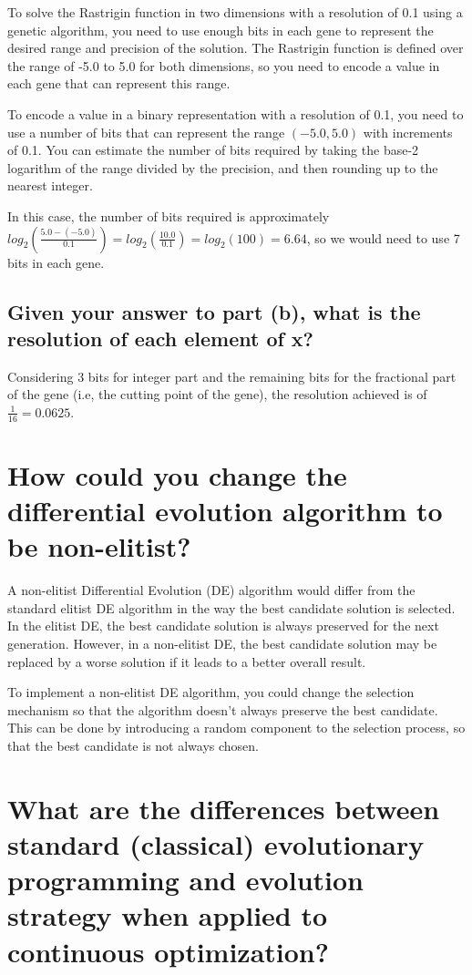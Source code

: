 \documentclass[conference]{IEEEtran}
\begin{document}
To solve the Rastrigin function in two dimensions with a resolution of 0.1 using a genetic algorithm, you need to use enough bits in each gene to represent the desired range and precision of the solution. The Rastrigin function is defined over the range of -5.0 to 5.0 for both dimensions, so you need to encode a value in each gene that can represent this range.

To encode a value in a binary representation with a resolution of 0.1, you need to use a number of bits that can represent the range $(-5.0, 5.0)$ with increments of 0.1. You can estimate the number of bits required by taking the base-2 logarithm of the range divided by the precision, and then rounding up to the nearest integer.

In this case, the number of bits required is approximately $log_2\left(\frac{5.0-(-5.0)}{0.1}\right) = log_2\left(\frac{10.0}{0.1}\right) = log_2(100) = 6.64$, so we would need to use 7 bits in each gene.

\subsection{Given your answer to part (b), what is the resolution of each element of x?}

Considering 3 bits for integer part and the remaining bits for the fractional part of the gene (i.e, the cutting point of the gene), the resolution achieved is of $\frac{1}{16} = 0.0625$.


\section{How could you change the differential evolution algorithm to be non-elitist?}

A non-elitist Differential Evolution (DE) algorithm would differ from the standard elitist DE algorithm in the way the best candidate solution is selected. In the elitist DE, the best candidate solution is always preserved for the next generation. However, in a non-elitist DE, the best candidate solution may be replaced by a worse solution if it leads to a better overall result.

To implement a non-elitist DE algorithm, you could change the selection mechanism so that the algorithm doesn't always preserve the best candidate. This can be done by introducing a random component to the selection process, so that the best candidate is not always chosen.


\section{What are the differences between standard (classical) evolutionary programming and evolution strategy when applied to continuous optimization?}
\end{document}
